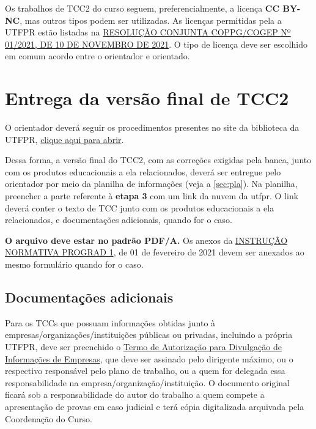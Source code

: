 \documentclass[a4paper, 12pt]{article}
\begin{document}
	Os trabalhos de TCC2 do curso seguem, preferencialmente, a licença \textbf{CC BY-NC}, mas outros tipos podem ser utilizadas. As licenças permitidas pela a UTFPR estão listadas na \href{https://sei.utfpr.edu.br/sei/publicacoes/controlador_publicacoes.php?acao=publicacao_visualizar&id_documento=2615190&id_orgao_publicacao=0}{RESOLUÇÃO CONJUNTA COPPG/COGEP Nº 01/2021, DE 10 DE NOVEMBRO DE 2021}. O tipo de licença deve ser escolhido em comum acordo entre o orientador e orientado.
	
	\section{Entrega da versão final de TCC2}
	
	O orientador deverá seguir os procedimentos presentes no site da biblioteca da UTFPR, \href{http://portal.utfpr.edu.br/biblioteca/trabalhos-academicos/docentes/procedimento-de-entrega-graduacao}{clique aqui para abrir}.
	
	Dessa forma, a versão final do TCC2, com as correções exigidas pela banca, junto com os produtos educacionais a ela relacionados, deverá ser entregue pelo orientador por meio da planilha de informações (veja a \autoref{sec:pla}). Na planilha, preencher a parte referente à \textbf{etapa 3} com um link da nuvem da utfpr. O link deverá conter o texto de TCC junto com os produtos educacionais a ela relacionados, e documentações adicionais, quando for o caso.
	
	\textbf{O arquivo deve estar no padrão PDF/A.} Os anexos da \href{https://sei.utfpr.edu.br/sei/publicacoes/controlador_publicacoes.php?acao=publicacao_visualizar&id_documento=2042165&id_orgao_publicacao=0}{INSTRUÇÃO NORMATIVA PROGRAD 1}, de 01 de fevereiro de 2021 devem ser anexados ao mesmo formulário quando for o caso. 

	\subsection{Documentações adicionais}
    Para os TCCs que possuam informações obtidas junto à empresas/organizações/instituições públicas ou privadas, incluindo a própria UTFPR, deve ser preenchido o \href{https://sei.utfpr.edu.br/sei/publicacoes/controlador_publicacoes.php?acao=publicacao_visualizar&id_documento=2651593&id_orgao_publicacao=0}{Termo de Autorização para Divulgação de Informações de Empresas}, que deve ser assinado pelo dirigente máximo, ou o respectivo responsável pelo plano de trabalho, ou a quem for delegada essa responsabilidade na empresa/organização/instituição. O documento original ficará sob a responsabilidade do autor do trabalho a quem compete a apresentação de provas em caso judicial e terá cópia digitalizada arquivada pela Coordenação do Curso.
\end{document}
